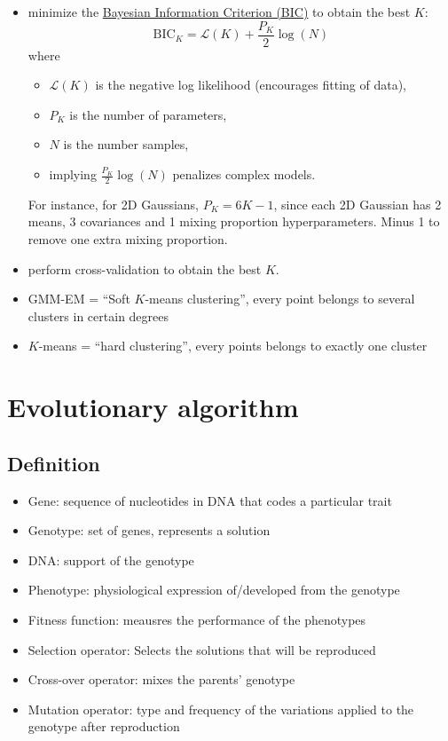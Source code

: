 \documentclass[twocolumn,landscape,10pt]{article}
\theoremstyle{definition}
\begin{document}
\begin{itemize}
\begin{itemize}
            \item minimize the \underline{Bayesian Information Criterion (BIC)}
                to obtain the best $K$:
                \[
                    \text{BIC}_K=\mathcal{L}(K)+\frac{P_K}{2}\log(N)
                \]
                where 
                \begin{itemize}
                    \item 
                        $\mathcal{L}(K)$ is the negative log likelihood
                        (encourages fitting of data),
                    \item $P_K$ is the number of parameters,
                    \item $N$ is the number samples, 
                    \item implying $\frac{P_K}{2}\log(N)$ penalizes
                        complex models.
                \end{itemize} 
                For instance, for 2D Gaussians, $P_K=6K-1$, since each 2D
                Gaussian has 2 means, 3 covariances and 1 mixing proportion
                hyperparameters. Minus 1 to remove one extra mixing proportion.
            \item perform cross-validation to obtain the best $K$.
            \item GMM-EM = ``Soft $K$-means clustering'', every point belongs to
                several clusters in certain degrees
            \item $K$-means = ``hard clustering'', every points belongs to
                exactly one cluster
        \end{itemize} 
\end{itemize} 

\section{Evolutionary algorithm}

\subsection{Definition}

\begin{itemize}
    \item Gene: sequence of nucleotides in DNA that codes a particular trait
    \item Genotype: set of genes, represents a solution
    \item DNA: support of the genotype
    \item Phenotype: physiological expression of/developed from the genotype
    \item Fitness function: meausres the performance of the phenotypes
    \item Selection operator: Selects the solutions that will be reproduced
    \item Cross-over operator: mixes the parents' genotype
    \item Mutation operator: type and frequency of the variations applied to the
        genotype after reproduction
\end{itemize} 
\end{document}
